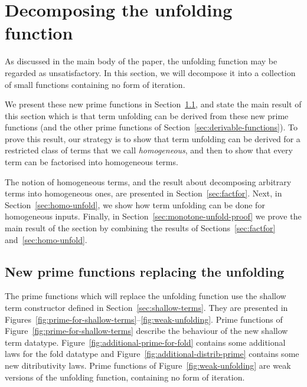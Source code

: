 \section{Decomposing the unfolding function}
\label{ap:matrix-power}
\newcommand{\treeunfold}{\mathrm{unfold}}

As discussed in the main body of the paper, the unfolding function may be regarded as unsatisfactory. In this section, we will decompose it into a collection of small functions containing no form of iteration.   

We present these new prime functions in Section~\ref{sec:functions-decomposing-unfolding}, and state the main result of this section which is that term unfolding  can be derived from these new prime functions (and the other prime functions of Section~\ref{sec:derivable-functions}). To prove this result, our strategy is to show that term unfolding can be derived for a restricted class of terms that we call \emph{homogeneous}, and then to show that every term can be factorised into  homogeneous terms. 

The notion of homogeneous terms, and the result about  decomposing arbitrary terms into homogeneous ones, are presented in Section~\ref{sec:factfor}. Next, in Section~\ref{sec:homo-unfold}, we show how term unfolding can be done for homogeneous inputs. Finally, in Section~\ref{sec:monotone-unfold-proof} we prove the main result of the section by combining  the results of Sections~\ref{sec:factfor} and~\ref{sec:homo-unfold}.

\subsection{New prime functions replacing the unfolding}\label{sec:functions-decomposing-unfolding}

The prime functions which will replace the unfolding function use the shallow term constructor defined in Section~\ref{sec:shallow-terms}. They are presented in Figures~\ref{fig:prime-for-shallow-terms}--\ref{fig:weak-unfolding}. Prime functions of Figure~\ref{fig:prime-for-shallow-terms} describe the behaviour of the new shallow term datatype. Figure~\ref{fig:additional-prime-for-fold} contains some additional laws for the fold datatype and Figure~\ref{fig:additional-distrib-prime} contains some new ditributivity laws. Prime functions of Figure~\ref{fig:weak-unfolding} are weak versions of the unfolding function, containing no form of iteration. 




